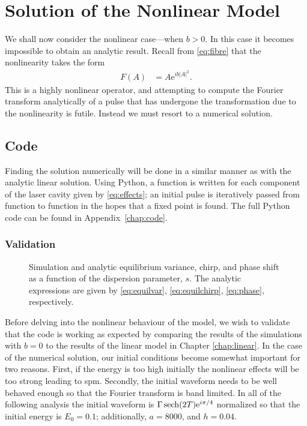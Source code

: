 
\chapter{Solution of the Nonlinear Model}
\label{chap:nl}
We shall now consider the nonlinear case---when $b > 0$. In this case it becomes impossible to obtain an analytic result. Recall from \eqref{eq:fibre} that the nonlinearity takes the form
\begin{align*}
F(A) &= A \textrm{e}^{i b |A|^2}.
\end{align*}
This is a highly nonlinear operator, and attempting to compute the Fourier transform analytically of a pulse that has undergone the transformation due to the nonlinearity is futile. Instead we must resort to a numerical solution. \\

\section{Code}
Finding the solution numerically will be done in a similar manner as with the analytic linear solution. Using Python, a function is written for each component of the laser cavity given by \eqref{eq:effects}; an initial pulse is iteratively passed from function to function in the hopes that a fixed point is found. The full Python code can be found in Appendix~\ref{chap:code}. \\

\subsection{Validation}
\begin{figure}[tbp]
\centering

\caption[Equilibrium variance, chirp, and phase shift of the pulse as a function of the dispersion parameter.]{Simulation and analytic equilibrium variance, chirp, and phase shift as a function of the dispersion parameter, $s$. The analytic expressions are given by \eqref{eq:equilvar}, \eqref{eq:equilchirp}, \eqref{eq:phase}, respectively.}
\label{fig:var}
\end{figure}
Before delving into the nonlinear behaviour of the model, we wish to validate that the code is working as expected by comparing the results of the simulations with $b=0$ to the results of the linear model in Chapter \ref{chap:linear}. In the case of the numerical solution, our initial conditions become somewhat important for two reasons. First, if the energy is too high initially the nonlinear effects will be too strong leading to \acrlong{spm}. Secondly, the initial waveform needs to be well behaved enough so that the Fourier transform is band limited. In all of the following analysis the initial waveform is $\Gamma \sech \left( 2T \right) \textrm{e}^{i \pi / 4}$ normalized so that the initial energy is $E_0 = 0.1$; additionally, $a = 8000$, and $h = 0.04$. \\

